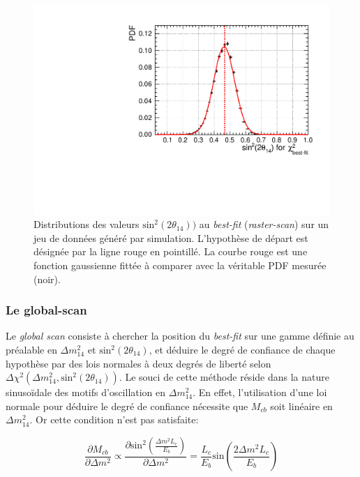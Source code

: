 {\begin{figure}[h!]

\centering
\includegraphics[width=0.6\linewidth]{images/profile_sin2theta_phase_2_0_466122_PDF_dm2-bin-50_sin2theta-bin-80.pdf}
\caption[Distributions des valeurs $\textrm{sin}^2(2\theta_{14}))$ au \textit{best-fit} (\textit{raster-scan}) sur un jeu de données généré par simulation]{Distributions des valeurs $\textrm{sin}^2(2\theta_{14}))$ au \textit{best-fit} (\textit{raster-scan}) sur un jeu de données généré par simulation. L'hypothèse de départ est désignée par la ligne rouge en pointillé. La courbe rouge est une fonction gaussienne fittée à comparer avec la véritable PDF mesurée (noir).}
\label{fig:profile_sin2theta}

\end{figure}

}

\subsubsection*{Le global-scan}

Le \og \textit{global scan} \fg{}  consiste à chercher la position du \textit{best-fit} sur une gamme définie au préalable en $\Delta m^2_{14}$ et $\textrm{sin}^2(2\theta_{14})$, et déduire le degré de confiance de chaque hypothèse par des lois normales à deux degrés de liberté selon $\Delta \chi^2 (\Delta m^2_{14}, \textrm{sin}^2(2\theta_{14}))$. Le souci de cette méthode réside dans la nature sinusoïdale des motifs d'oscillation en $\Delta m^2_{14}$. En effet, l'utilisation d'une loi normale pour déduire le degré de confiance nécessite que $M_{cb}$ soit linéaire en $\Delta m^2_{14}$. Or cette condition n'est pas satisfaite:

\begin{equation}
    \frac{\partial M_{cb}}{\partial \Delta m^2} \propto \frac{\partial \textrm{sin}^2\left(\frac{\Delta m^2 L_c}{E_b} \right)}{\partial \Delta m^2} = \frac{L_c}{E_b} \textrm{sin}\left(\frac{2\Delta m^2 L_c}{E_b}\right)
\end{equation}

